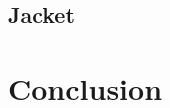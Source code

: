 \documentclass[12pt]{article} %
\begin{document}
\subsection{Jacket}











\section{Conclusion} %


\printbibliography

\end{document}
